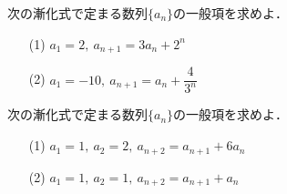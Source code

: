 \documentclass[a4paper,11pt]{ltjsarticle}
\begin{document}
\begin{toi}
次の漸化式で定まる数列$\{a_n\}$の一般項を求めよ．\\
\begin{minipage}{0.5\linewidth}
\begin{itemize}
    \item [(1)]$a_1=2,~a_{n+1}=3a_n+2^n$
\end{itemize}
\end{minipage}
\begin{minipage}{0.5\linewidth}
\begin{itemize}
    \item [(2)]$a_1=-10,~a_{n+1}=a_n+\dfrac{4}{3^n}$
\end{itemize}
\end{minipage}
\end{toi}
   \begin{toi}
次の漸化式で定まる数列$\{a_n\}$の一般項を求めよ．\\
\begin{minipage}{0.5\linewidth}
\begin{itemize}
    \item [(1)]    $a_1=1,~a_2=2,~a_{n+2}=a_{n+1}+6a_n$
\end{itemize}
\end{minipage}
\begin{minipage}{0.5\linewidth}
\begin{itemize}
    \item [(2)]$a_1=1,~a_2=1,~a_{n+2}=a_{n+1}+a_n$
\end{itemize}
\end{minipage}
\end{toi}
\end{document}
